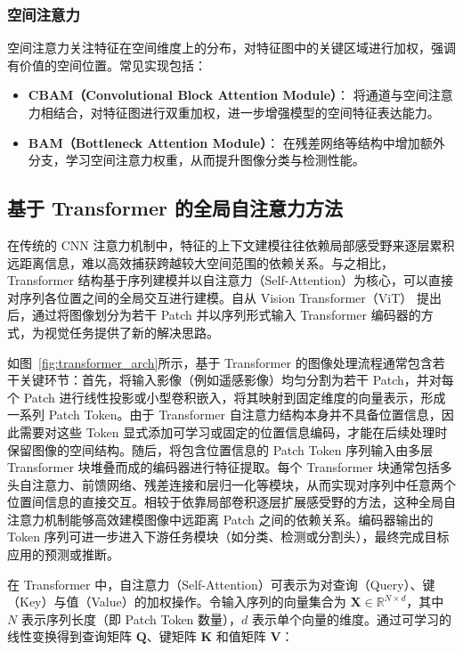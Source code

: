 \subsubsection{空间注意力}
空间注意力关注特征在空间维度上的分布，对特征图中的关键区域进行加权，强调有价值的空间位置。常见实现包括：
\begin{itemize}
	\item \textbf{CBAM（Convolutional Block Attention Module）}\cite{cbam}：
	将通道与空间注意力相结合，对特征图进行双重加权，进一步增强模型的空间特征表达能力。
	
	\item \textbf{BAM（Bottleneck Attention Module）}\cite{bam}：
	在残差网络等结构中增加额外分支，学习空间注意力权重，从而提升图像分类与检测性能。
\end{itemize}

\subsection{基于 Transformer 的全局自注意力方法}
\label{sec:transformer_attn}

在传统的 CNN 注意力机制中，特征的上下文建模往往依赖局部感受野来逐层累积远距离信息，难以高效捕获跨越较大空间范围的依赖关系。与之相比，Transformer 结构\cite{vaswani2017}基于序列建模并以自注意力（Self-Attention）为核心，可以直接对序列各位置之间的全局交互进行建模。自从 Vision Transformer（ViT）\cite{dosovitskiy2020image} 提出后，通过将图像划分为若干 Patch 并以序列形式输入 Transformer 编码器的方式，为视觉任务提供了新的解决思路。

如图~\ref{fig:transformer_arch}所示，基于 Transformer 的图像处理流程通常包含若干关键环节：首先，将输入影像（例如遥感影像）均匀分割为若干 Patch，并对每个 Patch 进行线性投影或小型卷积嵌入，将其映射到固定维度的向量表示，形成一系列 Patch Token。由于 Transformer 自注意力结构本身并不具备位置信息，因此需要对这些 Token 显式添加可学习或固定的位置信息编码，才能在后续处理时保留图像的空间结构。随后，将包含位置信息的 Patch Token 序列输入由多层 Transformer 块堆叠而成的编码器进行特征提取。每个 Transformer 块通常包括多头自注意力、前馈网络、残差连接和层归一化等模块，从而实现对序列中任意两个位置间信息的直接交互。相较于依靠局部卷积逐层扩展感受野的方法，这种全局自注意力机制能够高效建模图像中远距离 Patch 之间的依赖关系。编码器输出的 Token 序列可进一步进入下游任务模块（如分类、检测或分割头），最终完成目标应用的预测或推断。

在 Transformer 中，自注意力（Self-Attention）可表示为对查询（Query）、键（Key）与值（Value）的加权操作。令输入序列的向量集合为 $\mathbf{X}\in \mathbb{R}^{N \times d}$，其中 $N$ 表示序列长度（即 Patch Token 数量），$d$ 表示单个向量的维度。通过可学习的线性变换得到查询矩阵 $\mathbf{Q}$、键矩阵 $\mathbf{K}$ 和值矩阵 $\mathbf{V}$：

